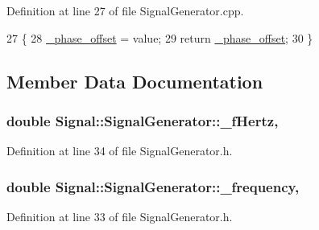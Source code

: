 Definition at line 27 of file Signal\+Generator.\+cpp.


\begin{DoxyCode}
27                                                                    \{
28     \hyperlink{class_signal_1_1_signal_generator_a6b4444d46747c8517171edbbf4b5588f}{\_phase\_offset} = value;
29     \textcolor{keywordflow}{return} \hyperlink{class_signal_1_1_signal_generator_a6b4444d46747c8517171edbbf4b5588f}{\_phase\_offset};
30 \}
\end{DoxyCode}


\subsection{Member Data Documentation}
\hypertarget{class_signal_1_1_signal_generator_a85a4702347352bab1c71e0a8df8437d6}{
\subsubsection[{\+\_\+f\+Hertz}]{\setlength{\rightskip}{0pt plus 5cm}double Signal\+::\+Signal\+Generator\+::\+\_\+f\+Hertz\hspace{0.3cm}{\ttfamily [protected]}, {\ttfamily [inherited]}}}\label{class_signal_1_1_signal_generator_a85a4702347352bab1c71e0a8df8437d6}


Definition at line 34 of file Signal\+Generator.\+h.

\hypertarget{class_signal_1_1_signal_generator_a7f107461333bce68c5dad412db96a8c2}{
\subsubsection[{\+\_\+frequency}]{\setlength{\rightskip}{0pt plus 5cm}double Signal\+::\+Signal\+Generator\+::\+\_\+frequency\hspace{0.3cm}{\ttfamily [protected]}, {\ttfamily [inherited]}}}\label{class_signal_1_1_signal_generator_a7f107461333bce68c5dad412db96a8c2}


Definition at line 33 of file Signal\+Generator.\+h.

